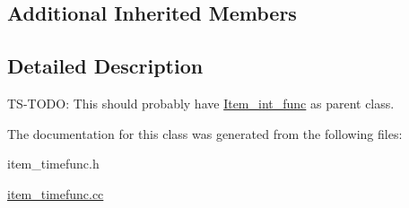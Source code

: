 \subsection*{Additional Inherited Members}


\subsection{Detailed Description}
TS-\/T\+O\+DO\+: This should probably have \mbox{\hyperlink{classItem__int__func}{Item\+\_\+int\+\_\+func}} as parent class. 

The documentation for this class was generated from the following files\+:\begin{DoxyCompactItemize}
\item 
item\+\_\+timefunc.\+h\item 
\mbox{\hyperlink{item__timefunc_8cc}{item\+\_\+timefunc.\+cc}}\end{DoxyCompactItemize}
